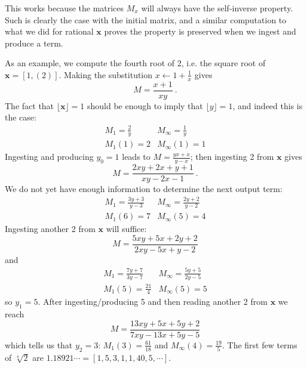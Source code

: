 \documentclass[11pt, oneside]{amsart}   	%
\begin{document}
This works because the matrices $M_x$ will always have the self-inverse property. Such is clearly the case with the initial matrix, and a
 similar computation to what we did for rational $\mathbf{x}$ proves the property is preserved when we ingest and produce a term.

As an example, we compute the fourth root of 2, i.e. the square root of $\mathbf{x} = [1,(2)]$.
Making the substitution $x \leftarrow 1 + \frac{1}{x}$ gives
\[
M = \frac{x+1}{xy}\ .
\]
The fact that $\lfloor \mathbf{x} \rfloor = 1$ should be enough to imply that $\lfloor y \rfloor = 1$, and indeed this is the case:
\begin{equation*}
\begin{array}{cc}
M_1 = \frac{2}{y} & M_\infty = \frac{1}{y} \\
M_1(1) = 2 & M_\infty(1) = 1
\end{array}
\end{equation*}
Ingesting and producing $y_0=1$ leads to $M=\frac{yx+x}{y-x}$; then ingesting 2 from $\mathbf{x}$ gives
\[
M = \frac{2xy + 2x + y + 1}{xy -2x -1}\ .
\]
We do not yet have enough information to determine the next output term:
\begin{equation*}
\begin{array}{cc}
M_1 = \frac{3y+3}{y-3} & M_\infty = \frac{2y+2}{y-2} \\
M_1(6) = 7 & M_\infty(5) = 4 
\end{array}
\end{equation*}
Ingesting another 2 from $\mathbf{x}$ will suffice:
\[
M = \frac{5xy+5x+2y+2}{2xy-5x+y-2}
\]
and
\begin{equation*}
\begin{array}{cc}
M_1 = \frac{7y+7}{3y-7} & M_\infty = \frac{5y+5}{2y-5} \\
M_1(5) =  \frac{21}{4} & M_\infty(5) =  5
\end{array}
\end{equation*}
so $y_1=5$. After ingesting/producing 5 and then reading another 2 from $\mathbf{x}$ we reach
\[
M = \frac{13xy+5x+5y+2}{7xy-13x+5y-5} 
\]
which tells us that $y_2=3$: $M_1(3)=\frac{61}{18}$ and $M_\infty(4)=\frac{19}{5}$. 
The first few terms of $\sqrt[4]{2}$ are $1.18921\cdots = [1,5,3,1,1,40,5,\cdots]$.
\end{document}
